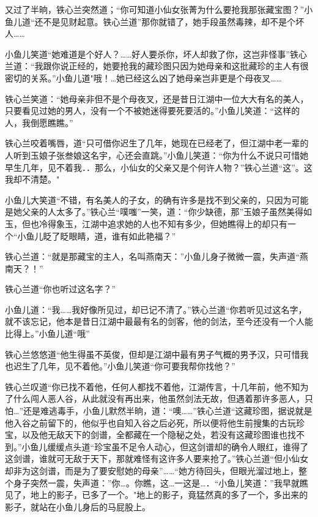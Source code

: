 \documentclass[12pt,oneside]{book}
\begin{document}
又过了半晌，铁心兰突然道；``你可知道小仙女张菁为什么要抢我那张藏宝图？''小鱼儿道``还不是见财起意。铁心兰道''那你就错了，她手段虽然毒辣，却不是个坏人\ldots\ldots{}

小鱼儿笑道``她难道是个好人？\ldots\ldots 好人要杀你，坏人却救了你，这岂非怪事''铁心兰道：``我跟你说正经的，她要抢我的藏珍图只因为她母亲和这批藏珍的主人有很密切的关系。''小鱼儿道"哦！\ldots 她已经这么凶了她母亲岂非更是个母夜叉\ldots\ldots{}

铁心兰笑道：``她母亲非但不是个母夜叉，还是昔日江湖中一位大大有名的美人，只要看见过她的男人，没有一个不被她迷得要死要活的。''小鱼儿笑道：``这样的人，我倒愿瞧瞧。''

铁心兰咬着嘴唇，道``只可借你迟生了几年，她现在已经老了，但江湖中老一辈的人听到玉娘子张叁娘这名宇，心还会直跳。''小鱼儿笑道：``你为什么不说只可惜她早生几年，见不着我．．那么，小仙女的父亲又是个何许人物？''铁心兰道``这''。这我却不清楚。"

小鱼儿大笑道``不错，有名美人的子女，的确有许多是找不到父亲的，只因为可能是她父亲的人太多了。''铁心兰``噗嗤''一笑，道：``你少缺德，那''玉娘子虽然美得如玉，但也冷得象玉，江湖中追求她的人也不知有多少，但她瞧得上的却只有一个``小鱼儿眨了眨眼睛，道，谁有如此艳福？''

铁心兰道：``就是那藏宝的主人，名叫燕南天：''小鱼儿身子微微一震，失声道``燕南天？！''

铁心兰道``你也听过这名字？''

小鱼儿道：``我\ldots\ldots 我好像所见过，却已记不清了。''铁心兰道``你若听见过这名字，就不该忘记，他本是昔日江湖中最最有名的剑客，他的剑法，至今还没有一个人能比得上。''小鱼儿道``哦''

铁心兰悠悠道``他生得虽不英俊，但却是江湖中最有男子气概的男予汉，只可惜我也迟生了几年，见不着他。''小鱼儿笑道``你可要我帮你找他？''

铁心兰叹道``你已找不着他，任何人都找不着他，江湖传言，十几年前，他不知为了什么闯人恶人谷，从此就没有再出来，他虽然剑法无故，但遇着那许多恶人，只怕\ldots{}''还是难逃毒手，小鱼儿默然半晌，道：``噢\ldots\ldots{}''铁心兰道``这藏珍图，据说就是他入谷之前留下的，他似乎也自知入谷之后必死，所以便将他生前搜集的古玩珍宝，以及他无敌天下的剑谱，全都藏在一个隐秘之处，若没有这藏珍图谁也找不到。''小鱼儿缓缓点头道``珍宝虽不足令人动心，但这剑谱却的确令人眼红，谁得了这剑谱，谁就可无敌于天下，那就难怪有这许多人要来抢了。''铁心兰道``但小仙女却非为这剑谱，而是为了要安慰她的母亲''\ldots\ldots{}``她方待回头，但眼光溜过地上，整个身子突然一震，失声道：''你\ldots。你瞧，这\ldots 一这是\ldots．``小鱼儿笑道：''我早就瞧见了，地上的影子，已多了一个。"地上的影子，竟猛然真的多了一个，多出来的影子，就站在小鱼儿身后的马屁股上。
\end{document}
